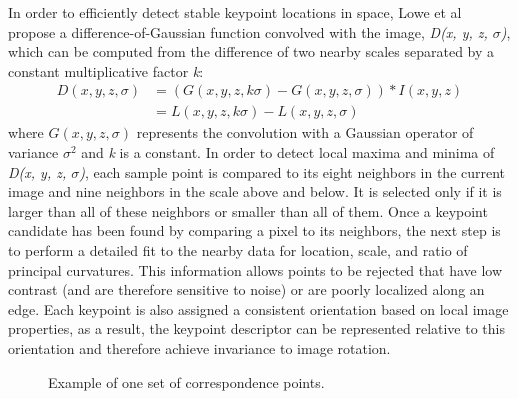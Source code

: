\documentclass{llncs}
\begin{document}
In order to efficiently detect stable keypoint locations in space, Lowe et al \cite{Lowe:04} propose a difference-of-Gaussian function convolved with the image, \textit{D(x, y, z, $\sigma$)}, which can be computed from the difference of two nearby scales separated by a constant multiplicative factor \textit{k}:
\begin{align}
    D(x,y,z,\sigma) &= (G(x,y,z,k\sigma) - G(x,y,z,\sigma)) * I(x,y,z) \\
                    &= L(x, y, z, k\sigma) - L(x, y, z, \sigma) \nonumber
\end{align}
where $G(x,y,z,\sigma)$ represents the convolution with a Gaussian operator of variance $\sigma^2$ and \textit{k} is a constant. In order to detect local maxima and minima of \textit{D(x, y, z, $\sigma$)}, each sample point is compared to its eight neighbors in the current image and nine neighbors in the scale above and below. It is selected only if it is larger than all of these neighbors or smaller than all of them. Once a keypoint candidate has been found by comparing a pixel to its neighbors, the next step is to perform a detailed fit to the nearby data for location, scale, and ratio of principal curvatures. This information allows points to be rejected that have low contrast (and are therefore sensitive to noise) or are poorly localized along an edge. Each keypoint is also assigned a consistent orientation \cite{Lowe:04} based on local image properties, as a result, the keypoint descriptor can be represented relative to this orientation and therefore achieve invariance to image rotation.

\begin{figure}
    \centering
    \caption{Example of one set of correspondence points.}
    \label{fig:corr}
\end{figure}
\end{document}
